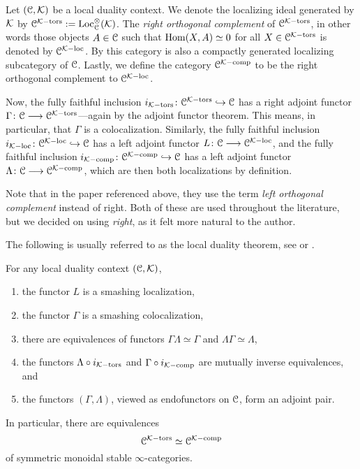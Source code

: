 \begin{construction}
    Let $(\EuScript{C}, \mathcal{K})$ be a local duality context. We denote the localizing ideal generated by $\mathcal{K}$ by $\EuScript{C}^{\mathcal{K}-\mathrm{tors}} := \operatorname{Loc}_{\EuScript{C}}^\otimes(\mathcal{K})$. The \emph{right orthogonal complement} of $\EuScript{C}^{\mathcal{K}-\mathrm{tors}}$, in other words those objects $A\in \EuScript{C}$ such that $\operatorname{Hom}(X, A) \simeq 0$ for all $X\in \EuScript{C}^{\mathcal{K}-\mathrm{tors}}$ is denoted by $\EuScript{C}^{\mathcal{K}-\mathrm{loc}}$. By \cite[2.17]{barthel-heard-valenzuela_2018} this category is also a compactly generated localizing subcategory of $\EuScript{C}$. Lastly, we define the category $\EuScript{C}^{\mathcal{K}-\mathrm{comp}}$ to be the right orthogonal complement to $\EuScript{C}^{\mathcal{K}-\mathrm{loc}}$. 

    Now, the fully faithful inclusion $i_{\mathcal{K}-\mathrm{tors}}\colon\EuScript{C}^{\mathcal{K}-\mathrm{tors}}\hookrightarrow \EuScript{C}$ has a right adjoint functor $\Gamma \colon\EuScript{C}\longrightarrow \EuScript{C}^{\mathcal{K}-\mathrm{tors}}$---again by the adjoint functor theorem. This means, in particular, that $\Gamma$ is a colocalization. Similarly, the fully faithful inclusion $i_{\mathcal{K}-\mathrm{loc}}\colon\EuScript{C}^{\mathcal{K}-\mathrm{loc}}\hookrightarrow \EuScript{C}$ has a left adjoint functor $L\colon \EuScript{C}\longrightarrow \EuScript{C}^{\mathcal{K}-\mathrm{loc}}$, and the fully faithful inclusion $i_{\mathcal{K}-\mathrm{comp}}\colon\EuScript{C}^{\mathcal{K}-\mathrm{comp}}\hookrightarrow \EuScript{C}$ has a left adjoint functor $\Lambda\colon\EuScript{C}\longrightarrow \EuScript{C}^{\mathcal{K}-\mathrm{comp}}$, which are then both localizations by definition. 
\end{construction}

\begin{remark}
    Note that in the paper \cite{barthel-heard-valenzuela_2018} referenced above, they use the term \emph{left orthogonal complement} instead of right. Both of these are used throughout the literature, but we decided on using \emph{right}, as it felt more natural to the author. 
\end{remark}

The following is usually referred to as the local duality theorem, see \cite[3.3.5]{hovey-palmiery-strickland_97} or \cite[2.21]{barthel-heard-valenzuela_2018}. 

\begin{theorem}
    \label{ch2:thm:local-duality-co-contra}
    For any local duality context $(\EuScript{C}, \mathcal{K})$, 
    \begin{enumerate}
        \item the functor $L$ is a smashing localization,
        \item the functor $\Gamma$ is a smashing colocalization, 
        \item there are equivalences of functors $\Gamma \Lambda \simeq \Gamma$ and $\Lambda\Gamma \simeq \Lambda$,  
        \item the functors $\Lambda\circ i_{\mathcal{K}-\mathrm{tors}}$ and $\Gamma \circ i_{\mathcal{K}-\mathrm{comp}}$ are mutually inverse equivalences, and 
        \item the functors $(\Gamma, \Lambda)$, viewed as endofunctors on $\EuScript{C}$, form an adjoint pair. 
    \end{enumerate} 
    In particular, there are equivalences
    \[\EuScript{C}^{\mathcal{K}-\mathrm{tors}}\simeq \EuScript{C}^{\mathcal{K}-\mathrm{comp}}\]
    of symmetric monoidal stable $\infty$-categories. 
\end{theorem}

